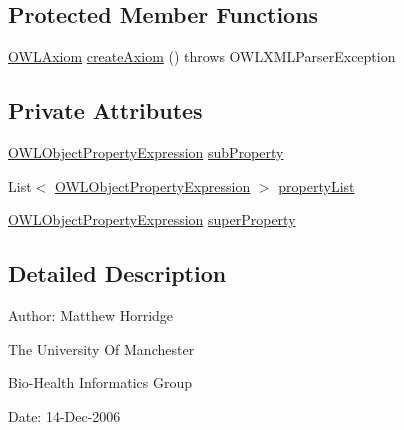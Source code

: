 \subsection*{Protected Member Functions}
\begin{DoxyCompactItemize}
\item 
\hyperlink{interfaceorg_1_1semanticweb_1_1owlapi_1_1model_1_1_o_w_l_axiom}{O\-W\-L\-Axiom} \hyperlink{classorg_1_1coode_1_1owlapi_1_1owlxmlparser_1_1_o_w_l_sub_object_property_of_axiom_element_handler_a8009b26ccd2a02960ac1a47daaaabe8a}{create\-Axiom} ()  throws O\-W\-L\-X\-M\-L\-Parser\-Exception 
\end{DoxyCompactItemize}
\subsection*{Private Attributes}
\begin{DoxyCompactItemize}
\item 
\hyperlink{interfaceorg_1_1semanticweb_1_1owlapi_1_1model_1_1_o_w_l_object_property_expression}{O\-W\-L\-Object\-Property\-Expression} \hyperlink{classorg_1_1coode_1_1owlapi_1_1owlxmlparser_1_1_o_w_l_sub_object_property_of_axiom_element_handler_ab3fa8e0b284132b1bf48bac15ff0322d}{sub\-Property}
\item 
List$<$ \hyperlink{interfaceorg_1_1semanticweb_1_1owlapi_1_1model_1_1_o_w_l_object_property_expression}{O\-W\-L\-Object\-Property\-Expression} $>$ \hyperlink{classorg_1_1coode_1_1owlapi_1_1owlxmlparser_1_1_o_w_l_sub_object_property_of_axiom_element_handler_a32ccd8f4618c66434ec1b8b2a4c630cd}{property\-List}
\item 
\hyperlink{interfaceorg_1_1semanticweb_1_1owlapi_1_1model_1_1_o_w_l_object_property_expression}{O\-W\-L\-Object\-Property\-Expression} \hyperlink{classorg_1_1coode_1_1owlapi_1_1owlxmlparser_1_1_o_w_l_sub_object_property_of_axiom_element_handler_a2e6deeabe65008018f2339f10aa86cc4}{super\-Property}
\end{DoxyCompactItemize}


\subsection{Detailed Description}
Author\-: Matthew Horridge\par
 The University Of Manchester\par
 Bio-\/\-Health Informatics Group\par
 Date\-: 14-\/\-Dec-\/2006\par
\par
 

